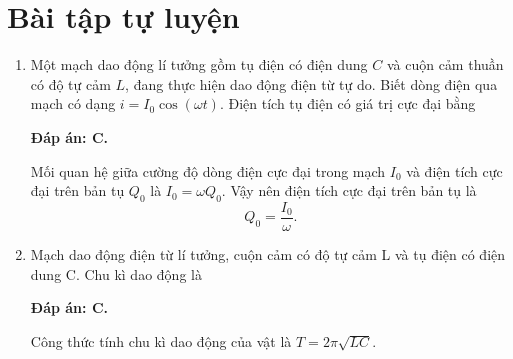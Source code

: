 \section{Bài tập tự luyện}
\begin{enumerate}[label=\bfseries Câu \arabic*:]
	\item {}
	
	{Một mạch dao động lí tưởng gồm tụ điện có điện dung $C$ và cuộn cảm thuần có độ tự cảm $L$, đang thực hiện dao động điện từ tự do. Biết dòng điện qua mạch có dạng $i = I_0 \cos \left( \omega t \right)$. Điện tích tụ điện có giá trị cực đại bằng
	}
	
	\hideall
	{		\textbf{Đáp án: C.}
		
		Mối quan hệ giữa cường độ dòng điện cực đại trong mạch $I_0$ và điện tích cực đại trên bản tụ $Q_0$ là $I_0 = \omega Q_0$. Vậy nên điện tích cực đại trên bản tụ là 
		$$Q_0 = \dfrac{I_0}{\omega}.$$
		
	}
	
	
	\item {}
	
	{Mạch dao động điện từ lí tưởng, cuộn cảm có độ tự cảm L và tụ điện có điện dung C. Chu kì dao động là
	}
	
	\hideall
	{		\textbf{Đáp án: C.}
		
		Công thức  tính chu kì dao động của vật là $T = 2\pi \sqrt{LC}$.
		
}
\end{enumerate}
